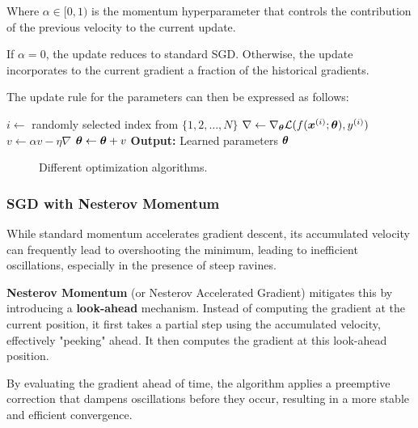 Where $\alpha \in [0, 1)$ is the momentum hyperparameter that controls the contribution of the previous velocity to the current update.

If $\alpha = 0$, the update reduces to standard SGD. Otherwise, the update incorporates to the current gradient a fraction of the historical gradients.

The update rule for the parameters can then be expressed as follows:
\begin{algorithm}[H]
    \caption{Stochastic Gradient Descent with Momentum}
    \begin{algorithmic}[1]
            \State $i \leftarrow$ randomly selected index from $\{1, 2, \ldots, N\}$
            \State $\nabla \leftarrow \nabla_{\boldsymbol{\theta}} \mathcal{L}(f(\boldsymbol{x}^{(i)}; \boldsymbol{\theta}), y^{(i)})$
            \State $v \leftarrow \alpha v - \eta \nabla$
            \State $\boldsymbol{\theta} \leftarrow \boldsymbol{\theta} + v$
        \EndWhile
        \State \textbf{Output:} Learned parameters $\boldsymbol{\theta}$
    \end{algorithmic}
\end{algorithm}

\begin{figure}[H]
    \centering
    \scalebox{0.3}{}
    \caption{Different optimization algorithms.}
\end{figure}

\subsubsection{SGD with Nesterov Momentum}
While standard momentum accelerates gradient descent, its accumulated velocity can frequently lead to overshooting the minimum, leading to inefficient oscillations, especially in the presence of steep ravines.

\textbf{Nesterov Momentum} (or Nesterov Accelerated Gradient) mitigates this by introducing a \textbf{look-ahead} mechanism.
Instead of computing the gradient at the current position, it first takes a partial step using the accumulated velocity, effectively "peeking" ahead.
It then computes the gradient at this look-ahead position.

By evaluating the gradient ahead of time, the algorithm applies a preemptive correction that dampens oscillations before they occur, resulting in a more stable and efficient convergence.

